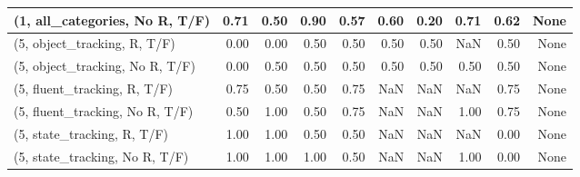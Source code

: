 \begin{table*}[h!]
\begin{adjustbox}{width=2\columnwidth,center}
\begin{tabular}{lrrr|rrr|rrr}
(1, all\_categories, No R, T/F)       &                      0.71 &                  0.50 &                      0.90 &                          0.57 &                      0.60 &                          0.20 &                                   0.71 &                               0.62 &                                  None \\



\midrule
(5, object\_tracking, R, T/F)         &                      0.00 &                  0.00 &                      0.50 &                          0.50 &                      0.50 &                          0.50 &                                    NaN &                               0.50 &                                  None \\
(5, object\_tracking, No R, T/F)      &                      0.00 &                  0.50 &                      0.50 &                          0.50 &                      0.50 &                          0.50 &                                   0.50 &                               0.50 &                                  None \\
(5, fluent\_tracking, R, T/F)         &                      0.75 &                  0.50 &                      0.50 &                          0.75 &                       NaN &                           NaN &                                    NaN &                               0.75 &                                  None \\
(5, fluent\_tracking, No R, T/F)      &                      0.50 &                  1.00 &                      0.50 &                          0.75 &                       NaN &                           NaN &                                   1.00 &                               0.75 &                                  None \\
(5, state\_tracking, R, T/F)          &                      1.00 &                  1.00 &                      0.50 &                          0.50 &                       NaN &                           NaN &                                    NaN &                               0.00 &                                  None \\
(5, state\_tracking, No R, T/F)       &                      1.00 &                  1.00 &                      1.00 &                          0.50 &                       NaN &                           NaN &                                   1.00 &                               0.00 &                                  None \\

\end{tabular}
\end{adjustbox}
\end{table*}
